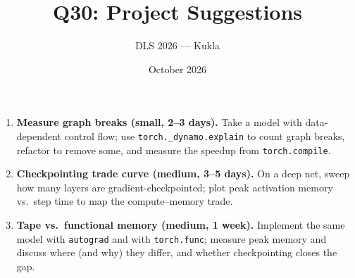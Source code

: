 \documentclass[11pt]{article}
\title{Q30: Project Suggestions}
\author{DLS 2026 --- Kukla}
\date{October 2026}
\begin{document}
\maketitle
\begin{enumerate}[leftmargin=1.5em]
\item \textbf{Measure graph breaks (small, 2--3 days).} Take a model with data-dependent control flow; use \texttt{torch.\_dynamo.explain} to count graph breaks, refactor to remove some, and measure the speedup from \texttt{torch.compile}.
\item \textbf{Checkpointing trade curve (medium, 3--5 days).} On a deep net, sweep how many layers are gradient-checkpointed; plot peak activation memory vs.\ step time to map the compute--memory trade.
\item \textbf{Tape vs.\ functional memory (medium, 1 week).} Implement the same model with \texttt{autograd} and with \texttt{torch.func}; measure peak memory and discuss where (and why) they differ, and whether checkpointing closes the gap.
\end{enumerate}
\end{document}
